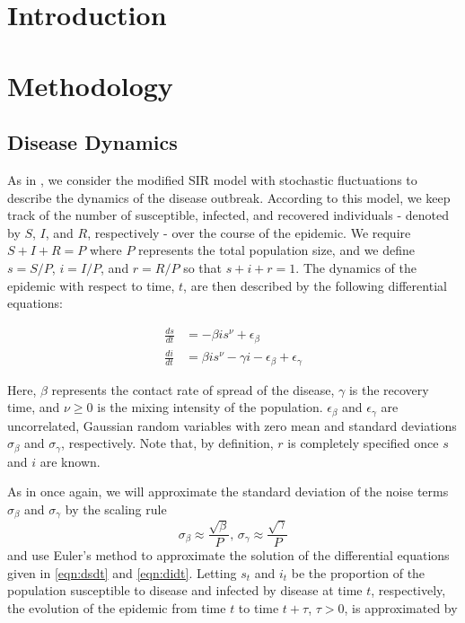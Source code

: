 \documentclass{article}
\begin{document}
\section{Introduction}

\section{Methodology}

\subsection{Disease Dynamics}

As in \citet{skvortsov}, we consider the modified SIR model with stochastic fluctuations to describe the dynamics of the disease outbreak.  According to this model, we keep track of the number of susceptible, infected, and recovered individuals - denoted by $S$, $I$, and $R$, respectively - over the course of the epidemic.  We require $S + I + R = P$ where $P$ represents the total population size, and we define $s = S/P$, $i = I/P$, and $r = R/P$ so that $s + i + r = 1$.  The dynamics of the epidemic with respect to time, $t$, are then described by the following differential equations:

\begin{align}
\frac{ds}{dt} &= -\beta is^\nu + \epsilon_\beta \label{eqn:dsdt} \\
\frac{di}{dt} &= \beta is^\nu - \gamma i - \epsilon_\beta + \epsilon_\gamma \label{eqn:didt}
\end{align}

\noindent Here, $\beta$ represents the contact rate of spread of the disease, $\gamma$ is the recovery time, and $\nu \ge 0$ is the mixing intensity of the population.  $\epsilon_\beta$ and $\epsilon_\gamma$ are uncorrelated, Gaussian random variables with zero mean and standard deviations $\sigma_\beta$ and $\sigma_\gamma$, respectively.  Note that, by definition, $r$ is completely specified once $s$ and $i$ are known.

As in \citet{skvortsov} once again, we will approximate the standard deviation of the noise terms $\sigma_\beta$ and $\sigma_\gamma$ by the scaling rule \[\sigma_\beta \approx \frac{\sqrt{\beta}}{P} \mbox{, } \sigma_\gamma \approx \frac{\sqrt{\gamma}}{P}\] and use Euler's method to approximate the solution of the differential equations given in \eqref{eqn:dsdt} and \eqref{eqn:didt}.  Letting $s_t$ and $i_t$ be the proportion of the population susceptible to disease and infected by disease at time $t$, respectively, the evolution of the epidemic from time $t$ to time $t + \tau$, $\tau > 0$, is approximated by
\end{document}
